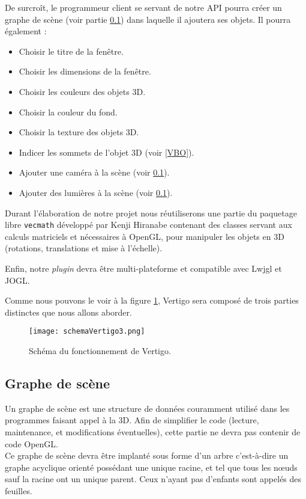 \documentclass[11pt]{report}
\begin{document}
De surcroît, le programmeur client se servant de notre API pourra créer un graphe de scène (voir partie \ref{gScene}) dans laquelle il ajoutera ses objets. 
Il pourra également :
\begin{itemize}
\item Choisir le titre de la fenêtre.
\item Choisir les dimensions de la fenêtre.
\item Choisir les couleurs des objets 3D.
\item Choisir la couleur du fond.
\item Choisir la texture des objets 3D.
\item Indicer les sommets de l'objet 3D (voir \ref{VBO}).
\item Ajouter une caméra à la scène (voir \ref{gScene}).
\item Ajouter des lumières à la scène (voir \ref{gScene}).
\end{itemize}

Durant l'élaboration de notre projet nous réutiliserons une partie du paquetage libre \texttt{vecmath} développé par Kenji Hiranabe contenant des classes servant aux calculs matriciels et nécessaires à OpenGL, pour manipuler les objets en 3D (rotations, translations et mise à l'échelle).


Enfin, notre \textit{plugin} devra être multi-plateforme et compatible avec Lwjgl et JOGL.

Comme nous pouvons le voir à la figure \ref{schemaVertigo}, Vertigo sera composé de trois parties distinctes que nous allons aborder.

\begin{figure}[h!]
  \caption{Schéma du fonctionnement de Vertigo.}
  \centering
  \label{schemaVertigo}
    \texttt{[image: schemaVertigo3.png]}
\end{figure}
 
 
 
\subsection{Graphe de scène} \label{gScene}
Un graphe de scène est une structure de données couramment utilisé dans les programmes faisant appel à la 3D.
Afin de simplifier le code (lecture, maintenance, et modifications éventuelles), cette partie ne devra pas contenir de code OpenGL.\\

Ce graphe de scène devra être implanté sous forme d'un arbre c'est-à-dire un graphe acyclique orienté possédant une unique racine, et tel que tous les nœuds sauf la racine ont un unique parent. Ceux n'ayant pas d'enfants sont appelés des feuilles. \\
\end{document}
